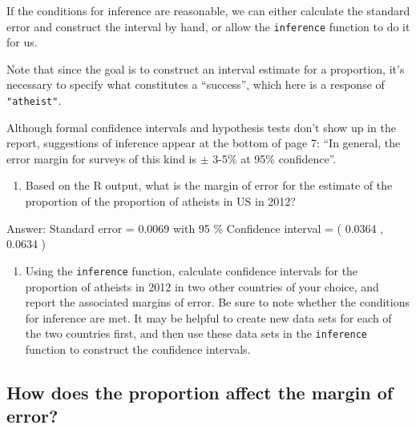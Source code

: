 \documentclass[
]{article}
\newenvironment{Shaded}{\begin{snugshade}}{\end{snugshade}}
\newcommand{\AttributeTok}[1]{\textcolor[rgb]{0.77,0.63,0.00}{#1}}
\newcommand{\FunctionTok}[1]{\textcolor[rgb]{0.00,0.00,0.00}{#1}}
\newcommand{\NormalTok}[1]{#1}
\newcommand{\SpecialCharTok}[1]{\textcolor[rgb]{0.00,0.00,0.00}{#1}}
\newcommand{\StringTok}[1]{\textcolor[rgb]{0.31,0.60,0.02}{#1}}
\providecommand{\tightlist}{%
  \setlength{\itemsep}{0pt}\setlength{\parskip}{0pt}}
\begin{document}
If the conditions for inference are reasonable, we can either calculate
the standard error and construct the interval by hand, or allow the
\texttt{inference} function to do it for us.

\begin{Shaded}
\end{Shaded}

Note that since the goal is to construct an interval estimate for a
proportion, it's necessary to specify what constitutes a ``success'',
which here is a response of \texttt{"atheist"}.

Although formal confidence intervals and hypothesis tests don't show up
in the report, suggestions of inference appear at the bottom of page 7:
``In general, the error margin for surveys of this kind is \(\pm\) 3-5\%
at 95\% confidence''.

\begin{enumerate}
\def\labelenumi{\arabic{enumi}.}
\setcounter{enumi}{5}
\tightlist
\item
  Based on the R output, what is the margin of error for the estimate of
  the proportion of the proportion of atheists in US in 2012?
\end{enumerate}

Answer: Standard error = 0.0069 with 95 \% Confidence interval = (
0.0364 , 0.0634 )

\begin{enumerate}
\def\labelenumi{\arabic{enumi}.}
\setcounter{enumi}{6}
\tightlist
\item
  Using the \texttt{inference} function, calculate confidence intervals
  for the proportion of atheists in 2012 in two other countries of your
  choice, and report the associated margins of error. Be sure to note
  whether the conditions for inference are met. It may be helpful to
  create new data sets for each of the two countries first, and then use
  these data sets in the \texttt{inference} function to construct the
  confidence intervals.
\end{enumerate}

\hypertarget{how-does-the-proportion-affect-the-margin-of-error}{%
\subsection{How does the proportion affect the margin of
error?}\label{how-does-the-proportion-affect-the-margin-of-error}}
\end{document}
